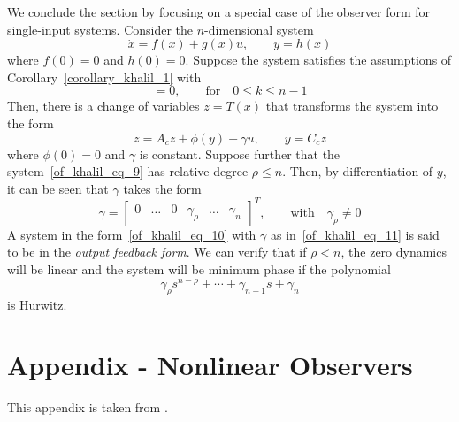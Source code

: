 \documentclass[11pt,a4paper,oneside]{book}
\numberwithin{equation}{section}
\theoremstyle{it}
\theoremstyle{definition}
\begin{document}
We conclude the section by focusing on a special case of the observer form for single-input systems. Consider the $n$-dimensional system
\begin{equation}\label{of_khalil_eq_9}
	\dot{x}=f(x)+g(x)u,\qquad y=h(x)
\end{equation}
where $f(0)=0$ and $h(0)=0$. Suppose the system satisfies the assumptions of Corollary~\ref{corollary_khalil_1} with
\begin{equation}
	[g,\,ad_f^k\tau]=0,\qquad\text{for}\quad 0\le k \le n-1
\end{equation}
Then, there is a change of variables $z=T(x)$ that transforms the system into the form
\begin{equation}\label{of_khalil_eq_10}
	\dot{z}=A_cz+\phi(y)+\gamma u,\qquad y=C_cz
\end{equation}
where $\phi(0)=0$ and $\gamma$ is constant. Suppose further that the system~\eqref{of_khalil_eq_9} has relative degree $\rho\le n$. Then, by differentiation of $y$, it can be seen that $\gamma$ takes the form
\begin{equation}\label{of_khalil_eq_11}
	\gamma = \begin{bmatrix} 0&\dots&0&\gamma_{\rho}&\dots&\gamma_n	\end{bmatrix}^T,\qquad\text{with}\quad \gamma_{\rho}\ne0
\end{equation}
A system in the form~\eqref{of_khalil_eq_10} with $\gamma$ as in~\eqref{of_khalil_eq_11} is said to be in the \textit{output feedback form}. We can verify that if $\rho<n$, the zero dynamics will be linear and the system will be minimum phase if the polynomial 
\begin{equation}
	\gamma_{\rho}s^{n-\rho}+\cdots+\gamma_{n-1}s+\gamma_n
\end{equation}
is Hurwitz.




























\chapter{Appendix - Nonlinear Observers}	
This appendix is taken from \cite{khalil_2}. 
\end{document}

